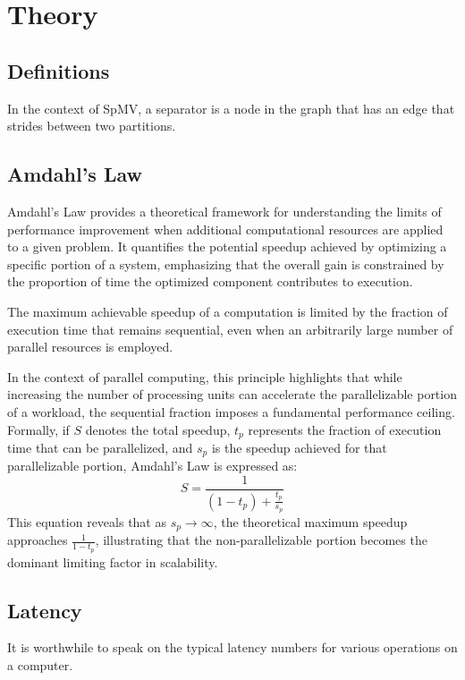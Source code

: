 
\chapter{Theory}

\section{Definitions}

\begin{definition}[Separator]
    In the context of SpMV, a separator is a node in the graph that has an edge that strides between two partitions.
\end{definition}

\section{Amdahl's Law}

Amdahl’s Law provides a theoretical framework for understanding the limits of performance improvement when additional computational resources are applied to a given problem. It quantifies the potential speedup achieved by optimizing a specific portion of a system, emphasizing that the overall gain is constrained by the proportion of time the optimized component contributes to execution.

\begin{definition} The maximum achievable speedup of a computation is limited by the fraction of execution time that remains sequential, even when an arbitrarily large number of parallel resources is employed. \end{definition}

In the context of parallel computing, this principle highlights that while increasing the number of processing units can accelerate the parallelizable portion of a workload, the sequential fraction imposes a fundamental performance ceiling. Formally, if \(S\)  denotes the total speedup, \(t_{p}\) represents the fraction of execution time that can be parallelized, and \(s_{p}\) is the speedup achieved for that parallelizable portion, Amdahl’s Law is expressed as:
\begin{equation} S = \frac{1}{(1 - t_p) + \frac{t_p}{s_p}} \end{equation}
This equation reveals that as \(s_{p} \rightarrow \infty\), the theoretical maximum speedup approaches \(\frac{1}{1-t_{p}}\), illustrating that the non-parallelizable portion becomes the dominant limiting factor in scalability.


\section{Latency}

It is worthwhile to speak on the typical latency numbers for various operations on a computer. 


